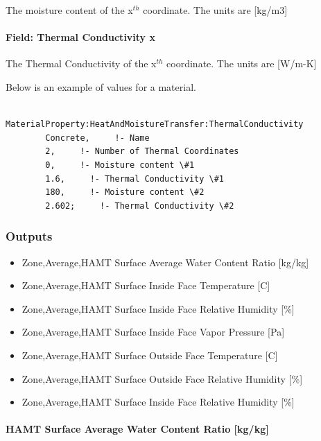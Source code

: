 The moisture content of the x\(^{th}\) coordinate. The units are {[}kg/m3{]}

\paragraph{Field: Thermal Conductivity x}\label{field-thermal-conductivity-x-1}

The Thermal Conductivity of the x\(^{th}\) coordinate. The units are {[}W/m-K{]}

Below is an example of values for a material.

\begin{lstlisting}

MaterialProperty:HeatAndMoistureTransfer:ThermalConductivity
        Concrete,     !- Name
        2,     !- Number of Thermal Coordinates
        0,     !- Moisture content \#1
        1.6,     !- Thermal Conductivity \#1
        180,     !- Moisture content \#2
        2.602;     !- Thermal Conductivity \#2
\end{lstlisting}

\subsubsection{Outputs}\label{outputs-2-021}

\begin{itemize}
\item
  Zone,Average,HAMT Surface Average Water Content Ratio {[}kg/kg{]}
\item
  Zone,Average,HAMT Surface Inside Face Temperature {[}C{]}
\item
  Zone,Average,HAMT Surface Inside Face Relative Humidity {[}\%{]}
\item
  Zone,Average,HAMT Surface Inside Face Vapor Pressure {[}Pa{]}
\item
  Zone,Average,HAMT Surface Outside Face Temperature {[}C{]}
\item
  Zone,Average,HAMT Surface Outside Face Relative Humidity {[}\%{]}
\item
  Zone,Average,HAMT Surface Inside Face Relative Humidity {[}\%{]}
\end{itemize}

\paragraph{HAMT Surface Average Water Content Ratio {[}kg/kg{]}}\label{hamt-surface-average-water-content-ratio-kgkg}

